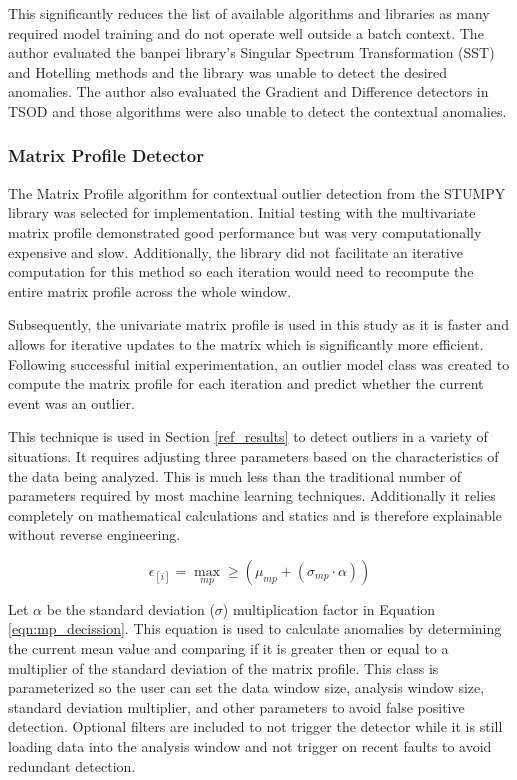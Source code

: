 This significantly reduces the list of available algorithms and libraries as many required model training and do not operate well outside a batch context. The author evaluated the banpei \parencite{banpei} library's Singular Spectrum Transformation (SST) and Hotelling methods and the library was unable to detect the desired anomalies. The author also evaluated the Gradient and Difference detectors in TSOD \parencite{tsod} and those algorithms were also unable to detect the contextual anomalies.

\subsubsection{Matrix Profile Detector}

The Matrix Profile algorithm for contextual outlier detection from the STUMPY library \parencite{law2019stumpy} was selected for implementation. Initial testing with the multivariate matrix profile demonstrated good performance but was very computationally expensive and slow. Additionally, the library did not facilitate an iterative computation for this method so each iteration would need to recompute the entire matrix profile across the whole window.

Subsequently, the univariate matrix profile is used in this study as it is faster and allows for iterative updates to the matrix which is significantly more efficient. Following successful initial experimentation, an outlier model class was created to compute the matrix profile for each iteration and predict whether the current event was an outlier. 

This technique is used in Section \ref{ref_results} to detect outliers in a variety of situations. It requires adjusting three parameters based on the characteristics of the data being analyzed. This is much less than the traditional number of parameters required by most machine learning techniques. Additionally it relies completely on mathematical calculations and statics and is therefore explainable without reverse engineering. 

\begin{equation}
    \label{eqn:mp_decission}
    \epsilon_{[i]} = \max_{mp} \geq \left(\mu_{mp} + \left(\sigma_{mp} \cdot \alpha\right)\right)
\end{equation}


Let $ \alpha$ be the standard deviation ($\sigma$) multiplication factor in Equation \eqref{eqn:mp_decission}. This equation is used to calculate anomalies by determining the current mean value and comparing if it is greater then or equal to a multiplier of the standard deviation of the matrix profile. This class is parameterized so the user can set the data window size, analysis window size, standard deviation multiplier, and other parameters to avoid false positive detection. Optional filters are included to not trigger the detector while it is still loading data into the analysis window and not trigger on recent faults to avoid redundant detection. 

